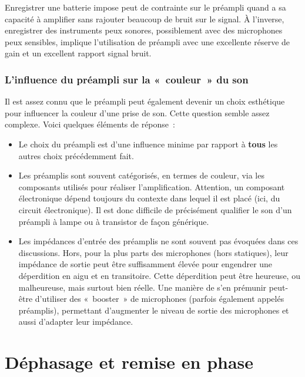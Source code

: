 \documentclass[
]{book}
\providecommand{\tightlist}{%
  \setlength{\itemsep}{0pt}\setlength{\parskip}{0pt}}
\begin{document}
Enregistrer une batterie impose peut de contrainte sur le préampli quand a sa capacité à amplifier sans rajouter beaucoup de bruit sur le signal. À l'inverse, enregistrer des instruments peux sonores, possiblement avec des microphones peux sensibles, implique l'utilisation de préampli avec une excellente réserve de gain et un excellent rapport signal bruit.

\hypertarget{linfluence-du-pruxe9ampli-sur-la-couleur-du-son}{%
\subsection{L'influence du préampli sur la «~couleur~» du son}\label{linfluence-du-pruxe9ampli-sur-la-couleur-du-son}}

Il est assez connu que le préampli peut également devenir un choix esthétique pour influencer la couleur d'une prise de son. Cette question semble assez complexe. Voici quelques éléments de réponse~:

\begin{itemize}
\tightlist
\item
  Le choix du préampli est d'une influence minime par rapport à \textbf{tous} les autres choix précédemment fait.
\item
  Les préamplis sont souvent catégorisés, en termes de couleur, via les composants utilisés pour réaliser l'amplification. Attention, un composant électronique dépend toujours du contexte dans lequel il est placé (ici, du circuit électronique). Il est donc difficile de précisément qualifier le son d'un préampli à lampe ou à transistor de façon générique.
\item
  Les impédances d'entrée des préamplis ne sont souvent pas évoquées dans ces discussions. Hors, pour la plus parts des microphones (hors statiques), leur impédance de sortie peut être suffisamment élevée pour engendrer une déperdition en aigu et en transitoire. Cette déperdition peut être heureuse, ou malheureuse, mais surtout bien réelle. Une manière de s'en prémunir peut-être d'utiliser des «~booster~» de microphones (parfois également appelés préamplis), permettant d'augmenter le niveau de sortie des microphones et aussi d'adapter leur impédance.
\end{itemize}

\hypertarget{duxe9phasage-et-remise-en-phase}{%
\chapter{Déphasage et remise en phase}\label{duxe9phasage-et-remise-en-phase}}
\end{document}
